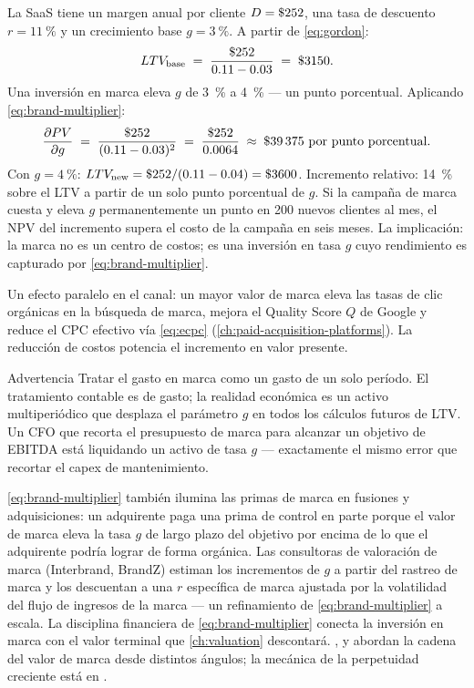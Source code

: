 \begin{example}
La SaaS tiene un margen anual por cliente \(D = \$\num{252}\), una tasa de descuento \(r = \qty{11}{\percent}\) y un crecimiento base \(g = \qty{3}{\percent}\). A partir de \cref{eq:gordon}:
\[
  LTV_{\text{base}} \;=\; \frac{\$\num{252}}{0.11-0.03} \;=\; \$\num{3150}.
\]
Una inversión en marca eleva \(g\) de \qty{3}{\percent} a \qty{4}{\percent} --- un punto porcentual. Aplicando \cref{eq:brand-multiplier}:
\[
  \frac{\partial PV}{\partial g} \;=\; \frac{\$\num{252}}{(0.11-0.03)^2} \;=\; \frac{\$\num{252}}{0.0064} \;\approx\; \$\num{39375} \text{ por punto porcentual}.
\]
Con \(g=\qty{4}{\percent}\): \(LTV_{\text{new}} = \$\num{252}/(0.11-0.04) = \$\num{3600}\). Incremento relativo: \qty{14}{\percent} sobre el LTV a partir de un solo punto porcentual de \(g\). Si la campaña de marca cuesta  y eleva \(g\) permanentemente un punto en 200 nuevos clientes al mes, el NPV del incremento supera el costo de la campaña en seis meses. La implicación: la marca no es un centro de costos; es una inversión en tasa \(g\) cuyo rendimiento es capturado por \cref{eq:brand-multiplier}.

Un efecto paralelo en el canal: un mayor valor de marca eleva las tasas de clic orgánicas en la búsqueda de marca, mejora el Quality Score \(Q\) de Google y reduce el CPC efectivo vía \cref{eq:ecpc} (\cref{ch:paid-acquisition-platforms}). La reducción de costos potencia el incremento en valor presente.
\end{example}

\begin{admonition}{Advertencia}
Tratar el gasto en marca como un gasto de un solo período. El tratamiento contable es de gasto; la realidad económica es un activo multiperiódico que desplaza el parámetro \(g\) en todos los cálculos futuros de LTV. Un CFO que recorta el presupuesto de marca para alcanzar un objetivo de EBITDA está liquidando un activo de tasa \(g\) --- exactamente el mismo error que recortar el capex de mantenimiento.
\end{admonition}

\cref{eq:brand-multiplier} también ilumina las primas de marca en fusiones y adquisiciones: un adquirente paga una prima de control en parte porque el valor de marca eleva la tasa \(g\) de largo plazo del objetivo por encima de lo que el adquirente podría lograr de forma orgánica. Las consultoras de valoración de marca (Interbrand, BrandZ) estiman los incrementos de \(g\) a partir del rastreo de marca y los descuentan a una \(r\) específica de marca ajustada por la volatilidad del flujo de ingresos de la marca --- un refinamiento de \cref{eq:brand-multiplier} a escala. La disciplina financiera de \cref{eq:brand-multiplier} conecta la inversión en marca con el valor terminal que \cref{ch:valuation} descontará. \textcite{keller1993customer}, \textcite{keller2019} y \textcite{aaker1996} abordan la cadena del valor de marca desde distintos ángulos; la mecánica de la perpetuidad creciente está en \textcite{brealey2020}.

